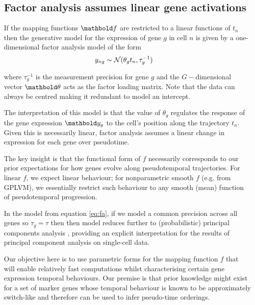 
\subsection{Factor analysis assumes linear gene activations}

If the mapping functions $\mbf$ are restricted to a linear functions of $t_n$ then the generative model for the expression of gene $g$ in cell $n$ is given by a one-dimensional factor analysis model of the form
\begin{equation} \label{eq:fa}
	\begin{aligned}
		y_{ng} & \sim \mathcal{N}(\theta_g t_n, \tau^{-1}_g)
	\end{aligned}
\end{equation}

where $\tau_g^{-1}$ is the measurement precision for gene $g$ and the $G-$dimensional vector $\mbtheta$ acts as the factor loading matrix. Note that the data can always be centred making it redundant to model an intercept.

The interpretation of this model is that the value of $\theta_g$ regulates the response of the gene expression $\mby_{g}$ to the cell's position along the trajectory $t_n$. Given this is necessarily linear, factor analysis assumes a linear change in expression for each gene over pseudotime.

The key insight is that the functional form of $f$ necessarily corresponds to our prior expectations for how genes evolve along pseudotemporal trajectories. For linear $f$, we expect linear behaviour; for nonparametric smooth $f$ (e.g. from GPLVM), we essentially restrict such behaviour to any smooth (mean) function of pseudotemporal progression.

In the model from equation \ref{eq:fa}, if we model a common precision across all genes so $\tau_g = \tau$ then then model reduces further to
(probabilistic) principal components analysis \cite{tipping1999probabilistic}, providing an explicit interpretation for the results of principal component analysis on single-cell data.



Our objective here is to use parametric forms for the mapping function $f$ that will enable relatively fast computations whilst characterising certain gene expression temporal behaviours. Our premise is that prior knowledge might exist for a set of marker genes whose temporal behaviour is known to be approximately switch-like and therefore can be used to infer pseudo-time orderings.



